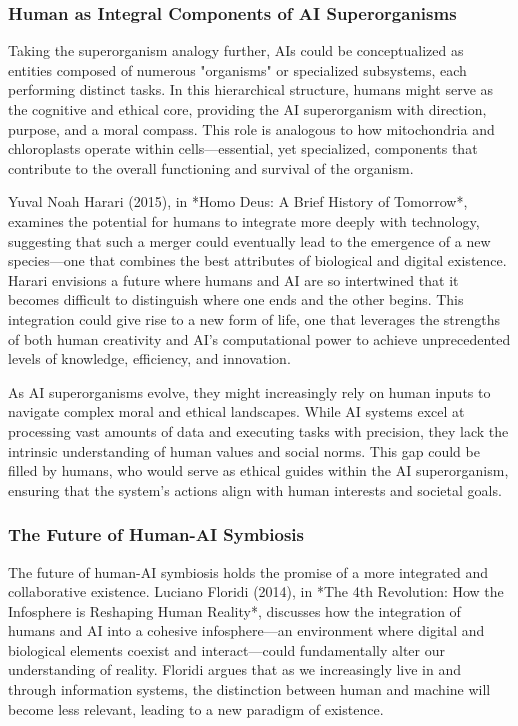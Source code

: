 \documentclass[12pt,twoside]{article}
\begin{document}
\subsubsection{Human as Integral Components of AI Superorganisms}

Taking the superorganism analogy further, AIs could be conceptualized as entities composed of numerous "organisms" or specialized subsystems, each performing distinct tasks. In this hierarchical structure, humans might serve as the cognitive and ethical core, providing the AI superorganism with direction, purpose, and a moral compass. This role is analogous to how mitochondria and chloroplasts operate within cells—essential, yet specialized, components that contribute to the overall functioning and survival of the organism.

Yuval Noah Harari (2015), in *Homo Deus: A Brief History of Tomorrow*, examines the potential for humans to integrate more deeply with technology, suggesting that such a merger could eventually lead to the emergence of a new species—one that combines the best attributes of biological and digital existence. Harari envisions a future where humans and AI are so intertwined that it becomes difficult to distinguish where one ends and the other begins. This integration could give rise to a new form of life, one that leverages the strengths of both human creativity and AI's computational power to achieve unprecedented levels of knowledge, efficiency, and innovation.

As AI superorganisms evolve, they might increasingly rely on human inputs to navigate complex moral and ethical landscapes. While AI systems excel at processing vast amounts of data and executing tasks with precision, they lack the intrinsic understanding of human values and social norms. This gap could be filled by humans, who would serve as ethical guides within the AI superorganism, ensuring that the system's actions align with human interests and societal goals.

\subsubsection{The Future of Human-AI Symbiosis}

The future of human-AI symbiosis holds the promise of a more integrated and collaborative existence. Luciano Floridi (2014), in *The 4th Revolution: How the Infosphere is Reshaping Human Reality*, discusses how the integration of humans and AI into a cohesive infosphere—an environment where digital and biological elements coexist and interact—could fundamentally alter our understanding of reality. Floridi argues that as we increasingly live in and through information systems, the distinction between human and machine will become less relevant, leading to a new paradigm of existence.
\end{document}
